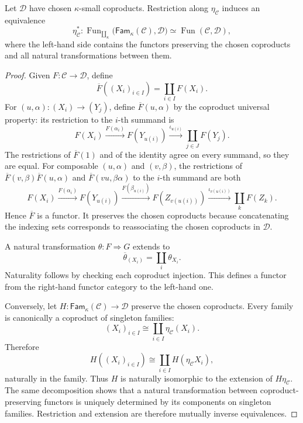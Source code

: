 \documentclass[runningheads,envcountsame]{llncs}
\newcommand{\Fam}{\mathsf{Fam}}
\begin{document}
\begin{theorem}
\label{thm:fam-up-app}
Let $\mathcal D$ have chosen $\kappa$-small coproducts. Restriction along $\eta_\mathcal C$ induces an equivalence
$$
\eta_\mathcal C^*:
\operatorname{Fun}_{\amalg_\kappa}
\bigl(\Fam_\kappa(\mathcal C),\mathcal D\bigr)
\simeq
\operatorname{Fun}(\mathcal C,\mathcal D),
$$
where the left-hand side contains the functors preserving the chosen coproducts and all natural transformations between them.
\end{theorem}

\begin{proof}
Given $F:\mathcal C\to\mathcal D$, define
$$
\overline F((X_i)_{i\in I})
=
\coprod_{i\in I}F(X_i).
$$
For $(u,\alpha):(X_i)\to(Y_j)$, define $\overline F(u,\alpha)$ by the coproduct universal property: its restriction to the $i$-th summand is
$$
F(X_i)
\xrightarrow{F(\alpha_i)}
F(Y_{u(i)})
\xrightarrow{\iota_{u(i)}}
\coprod_{j\in J}F(Y_j).
$$
The restrictions of $\overline F(1)$ and of the identity agree on every summand, so they are equal. For composable $(u,\alpha)$ and $(v,\beta)$, the restrictions of $\overline F(v,\beta)\overline F(u,\alpha)$ and $\overline F(vu,\beta\alpha)$ to the $i$-th summand are both
$$
F(X_i)
\xrightarrow{F(\alpha_i)}
F(Y_{u(i)})
\xrightarrow{F(\beta_{u(i)})}
F(Z_{v(u(i))})
\xrightarrow{\iota_{v(u(i))}}
\coprod_kF(Z_k).
$$
Hence $\overline F$ is a functor. It preserves the chosen coproducts because concatenating the indexing sets corresponds to reassociating the chosen coproducts in $\mathcal D$.

A natural transformation $\theta:F\Rightarrow G$ extends to
$$
\overline\theta_{(X_i)}=\coprod_i\theta_{X_i}.
$$
Naturality follows by checking each coproduct injection. This defines a functor from the right-hand functor category to the left-hand one.

Conversely, let $H:\Fam_\kappa(\mathcal C)\to\mathcal D$ preserve the chosen coproducts. Every family is canonically a coproduct of singleton families:
$$
(X_i)_{i\in I}
\cong
\coprod_{i\in I}\eta_\mathcal C(X_i).
$$
Therefore
$$
H((X_i)_{i\in I})
\cong
\coprod_{i\in I}H(\eta_\mathcal C X_i),
$$
naturally in the family. Thus $H$ is naturally isomorphic to the extension of $H\eta_\mathcal C$. The same decomposition shows that a natural transformation between coproduct-preserving functors is uniquely determined by its components on singleton families. Restriction and extension are therefore mutually inverse equivalences.
\end{proof}
\end{document}
